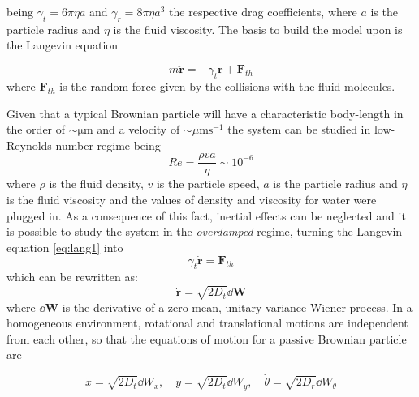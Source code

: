 \documentclass[../../master_thesis_np.tex]{subfiles}
\begin{document}
	being $\gamma_t = 6 \pi \eta a$ and $\gamma_r = 8 \pi \eta a^3$  the respective drag coefficients, where $a$ is the particle radius and $\eta$ is the fluid viscosity. 
	The basis to build the model upon is the Langevin equation
	
	\begin{equation} \label{eq:lang1}
		m \mathbf{\ddot{r}} = -\gamma_t \mathbf{\dot{r}} + \mathbf{F}_{th}
	\end{equation} 
	where $\mathbf{F}_{th}$ is the random force given by the collisions with the fluid molecules.
	
	Given that a typical Brownian particle will have a characteristic body-length in the order of $ \mathrm{\sim\mu m}$ and a velocity of $\sim\mu \mathrm{m s}^{-1}$  the system can be studied in low-Reynolds number regime being 
	\begin{equation}
	Re = \frac{\rho v a}{\eta} \sim 10^{-6} 
	\end{equation}  
	where $\rho$ is the fluid density, $v$ is the particle speed, $a$ is the particle radius and $\eta$ is the fluid viscosity and the values of density and viscosity for water were plugged in. 
	As a consequence of this fact, inertial effects can be neglected and it is possible to study the system in the \emph{overdamped} regime, turning the Langevin equation \ref{eq:lang1} into
	\begin{equation} \label{eq:lang2}
		\gamma_t \mathbf{\dot{r}} = \mathbf{F}_{th}
	\end{equation}
	which can be rewritten as:
	\begin{equation}
		\mathbf{\dot{r}} = \sqrt{2D_t} \dd{\mathbf{W}}
	\end{equation}
	where $\dd{\mathbf{W}}$ is the derivative of a zero-mean, unitary-variance Wiener process.
	In a homogeneous environment, rotational and translational motions are independent from each other, so that the equations of motion for a passive Brownian particle are
	
	\begin{equation}
		\dot{x} = \sqrt{2D_t}\dd{W_x}, \quad \dot{y} = \sqrt{2D_t}\dd{W_y}, \quad \dot{\theta} = \sqrt{2D_r}\dd{W_{\theta}}
	\end{equation}
	
	
\end{document}
